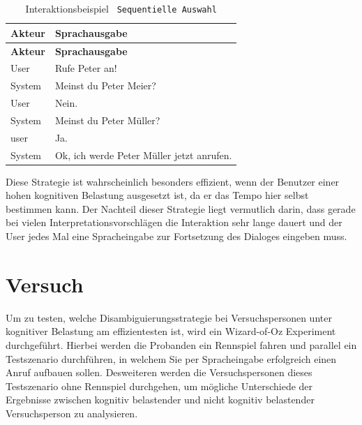 \documentclass[12pt,a4paper]{scrartcl}
\begin{document}
\begin{longtable}{p{6cm}p{8cm}}
	\caption[Interaktionsbeispiel \texttt{Sequentielle Auswahl}]{Interaktionsbeispiel \texttt{ Sequentielle Auswahl}}\\
	\hline
	\textbf{Akteur} &	\textbf{Sprachausgabe}\\
	\hline
	\endfirsthead
	\hline
	\textbf{Akteur} &	\textbf{Sprachausgabe}\\
	\hline
	\endhead
User & Rufe Peter an!\\
System & Meinst du Peter Meier?\\
User & Nein.\\
System & Meinst du Peter Müller?\\
user & Ja.\\
System & Ok, ich werde Peter Müller jetzt anrufen.\\

\hline
\end{longtable}

Diese Strategie ist wahrscheinlich besonders effizient, wenn der Benutzer einer hohen kognitiven Belastung ausgesetzt ist, da er das Tempo hier selbst bestimmen kann. Der Nachteil dieser Strategie liegt vermutlich darin, dass gerade bei vielen Interpretationsvorschlägen die Interaktion sehr lange dauert und der User jedes Mal eine Spracheingabe zur Fortsetzung des Dialoges eingeben muss. 

\section{Versuch}
Um zu testen, welche Disambiguierungsstrategie bei Versuchspersonen unter kognitiver Belastung am effizientesten ist, wird ein Wizard-of-Oz Experiment durchgeführt. Hierbei werden die Probanden ein Rennspiel fahren und parallel ein Testszenario durchführen, in welchem Sie per Spracheingabe erfolgreich einen Anruf aufbauen sollen. Desweiteren werden die Versuchspersonen dieses Testszenario ohne Rennspiel durchgehen, um mögliche Unterschiede der Ergebnisse zwischen kognitiv belastender und nicht kognitiv belastender Versuchsperson zu analysieren. 
\end{document}
